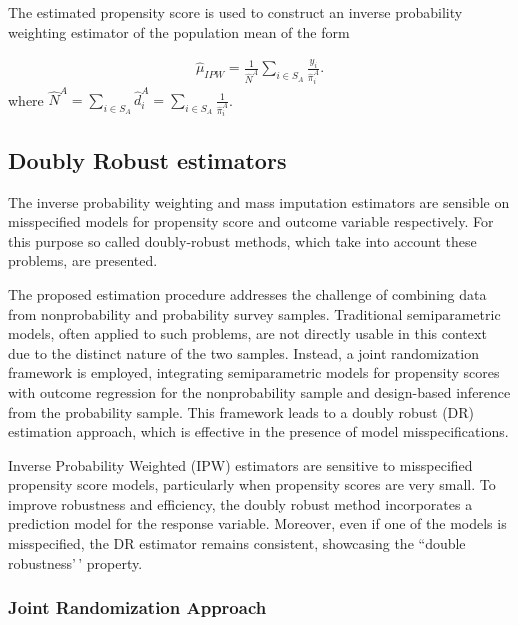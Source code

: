 \documentclass[
]{jss}
\begin{document}
The estimated propensity score is used to construct an inverse
probability weighting estimator of the population mean of the form

\begin{equation}
\begin{gathered}
\hat{\mu}_{I P W}=\frac{1}{\hat{N}^A} \sum_{i \in S_A} \frac{y_i}{\hat{\pi}_i^A}.
\end{gathered}
\end{equation} where
\(\hat{N}^A = \sum_{i \in S_A} \hat{d}_i^A = \sum_{i \in S_A} \frac{1}{\hat{\pi}_i^A}\).

\hypertarget{doubly-robust-estimators}{%
\subsection{Doubly Robust estimators}\label{doubly-robust-estimators}}

The inverse probability weighting and mass imputation estimators are
sensible on misspecified models for propensity score and outcome
variable respectively. For this purpose so called doubly-robust methods,
which take into account these problems, are presented.

The proposed estimation procedure addresses the challenge of combining
data from nonprobability and probability survey samples. Traditional
semiparametric models, often applied to such problems, are not directly
usable in this context due to the distinct nature of the two samples.
Instead, a joint randomization framework is employed, integrating
semiparametric models for propensity scores with outcome regression for
the nonprobability sample and design-based inference from the
probability sample. This framework leads to a doubly robust (DR)
estimation approach, which is effective in the presence of model
misspecifications.

Inverse Probability Weighted (IPW) estimators are sensitive to
misspecified propensity score models, particularly when propensity
scores are very small. To improve robustness and efficiency, the doubly
robust method incorporates a prediction model for the response variable.
Moreover, even if one of the models is misspecified, the DR estimator
remains consistent, showcasing the ``double robustness'\,' property.

\hypertarget{joint-randomization-approach}{%
\subsubsection{Joint Randomization
Approach}\label{joint-randomization-approach}}
\end{document}
